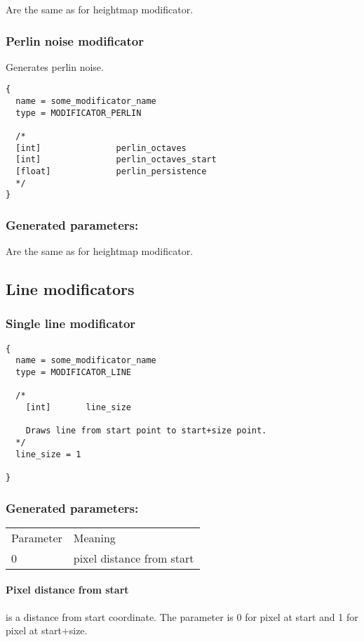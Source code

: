 \documentclass[9pt]{article}
\begin{document}
Are the same as for heightmap modificator.

\subsubsection{Perlin noise modificator}

Generates perlin noise.

\begin{verbatim}
{
  name = some_modificator_name
  type = MODIFICATOR_PERLIN

  /*
  [int]               perlin_octaves
  [int]               perlin_octaves_start
  [float]             perlin_persistence
  */
}
\end{verbatim}

\subsubsection*{Generated parameters:}
Are the same as for heightmap modificator.

\subsection{Line modificators}
\subsubsection{Single line modificator}

\begin{verbatim}
{
  name = some_modificator_name
  type = MODIFICATOR_LINE

  /*
    [int]       line_size
    
    Draws line from start point to start+size point.
  */
  line_size = 1
  
}
\end{verbatim}

\subsubsection*{Generated parameters:}

\begin{tabular}{|l||l|}
  Parameter & Meaning \\
  0 & pixel distance from start \\
\end{tabular}

\paragraph*{Pixel distance from start} is a distance from start coordinate. 
The parameter is 0 for pixel at start and 1 for pixel at start+size.
\end{document}
